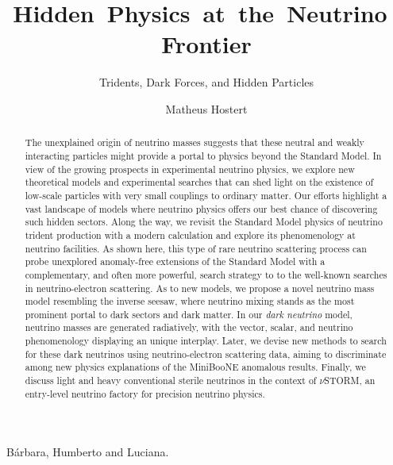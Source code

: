 \documentclass[openany,twoside,frontopenright,openright]{ip3thesis}
\begin{document}
\title{Hidden~Physics~at~the~Neutrino~Frontier}
\subtitle{Tridents, Dark Forces, and Hidden Particles}
\author{Matheus Hostert}
\maketitlepage*

\begin{abstract}
%
The unexplained origin of neutrino masses suggests that these neutral and weakly interacting particles might provide a portal to physics beyond the Standard Model. In view of the growing prospects in experimental neutrino physics, we explore new theoretical models and experimental searches that can shed light on the existence of low-scale particles with very small couplings to ordinary matter. Our efforts highlight a vast landscape of models where neutrino physics offers our best chance of discovering such hidden sectors. Along the way, we revisit the Standard Model physics of neutrino trident production with a modern calculation and explore its phenomenology at neutrino facilities. As shown here, this type of rare neutrino scattering process can probe unexplored anomaly-free extensions of the Standard Model with a complementary, and often more powerful, search strategy to to the well-known searches in neutrino-electron scattering. As to new models, we propose a novel neutrino mass model resembling the inverse seesaw, where neutrino mixing stands as the most prominent portal to dark sectors and dark matter. In our \emph{dark neutrino} model, neutrino masses are generated radiatively, with the vector, scalar, and neutrino phenomenology displaying an unique interplay. Later, we devise new methods to search for these dark neutrinos using neutrino-electron scattering data, aiming to discriminate among new physics explanations of the MiniBooNE anomalous results. Finally, we discuss light and heavy conventional sterile neutrinos in the context of $\nu$STORM, an entry-level neutrino factory for precision neutrino physics.
%
\end{abstract}


\begin{dedication*}
%
B\'arbara, Humberto and Luciana.
%
\end{dedication*}

\disableprotrusion
\tableofcontents*
\listoffigures
\enableprotrusion
\end{document}
